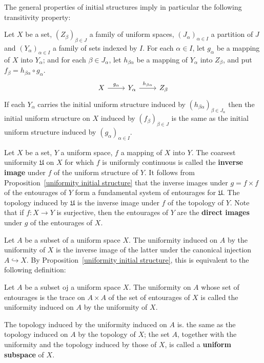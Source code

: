 The general properties of initial structures imply in particular the following transitivity property:
\begin{proposition}
Let $X$ be a set, $(Z_\beta)_{\beta\in J}$ a family of uniform spaces, $(J_\alpha)_{\alpha\in I}$ a partition of $J$ and $(Y_\alpha)_{\alpha\in I}$ a family of sets indexed by $I$. For each $\alpha\in I$, let $g_\alpha$ be a mapping of $X$ into $Y_\alpha$; and for each $\beta\in J_\alpha$, let $h_{\beta\alpha}$ be a mapping of $Y_\alpha$ into $Z_\beta$, and put $f_\beta=h_{\beta\alpha}\circ g_\alpha$. 
\[\begin{tikzcd}
X\ar[r,"g_\alpha"]&Y_\alpha\ar[r,"h_{\beta\alpha}"]&Z_\beta
\end{tikzcd}\]
If each $Y_\alpha$ carries the initial uniform structure induced by $(h_{\beta\alpha})_{\beta\in J_\alpha}$ then the initial uniform structure on $X$ induced by $(f_\beta)_{\beta\in J}$ is the same as the initial uniform structure induced by $(g_\alpha)_{\alpha\in I}$.
\end{proposition}
Let $X$ be a set, $Y$ a uniform space, $f$ a mapping of $X$ into $Y$. The coarsest uniformity $\mathfrak{U}$ on $X$ for which $f$ is uniformly continuous is called the \textbf{inverse image} under $f$ of the uniform structure of $Y$. It follows from Proposition~\ref{uniformity initial structure} that the inverse images under $g=f\times f$ of the entourages of $Y$ form a fundamental system of entourages for $\mathfrak{U}$. The topology induced by $\mathfrak{U}$ is the inverse image under $f$ of the topology of $Y$. Note that if $f:X\to Y$ is surjective, then the entourages of $Y$ are the \textbf{direct images} under $g$ of the entourages of $X$.\par
Let $A$ be a subset of a uniform space $X$. The uniformity induced on $A$ by the uniformity of $X$ is the inverse image of the latter under the canonical injection $A\hookrightarrow X$. By Proposition~\ref{uniformity initial structure}, this is equivalent to the following definition:
\begin{definition}
Let $A$ be a subset oj a uniform space $X$. The uniformity on $A$ whose set of entourages is the trace on $A\times A$ of the set of entourages of $X$ is called the uniformity induced on $A$ by the uniformity of $X$.
\end{definition}
The topology induced by the uniformity induced on $A$ is. the same as the topology induced on $A$ by the topology of $X$; the set $A$, together with the uniformity and the topology induced by those of $X$, is called a \textbf{uniform subspace} of $X$.\par
